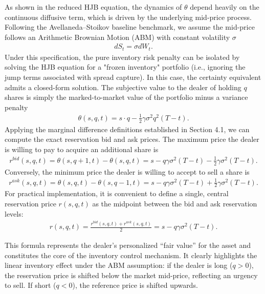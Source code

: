 \documentclass[a4paper,10pt,titlepage,oneside,openany]{book}
\theoremstyle{plain}\newtheorem{theorem}{Theorem}[chapter]
\theoremstyle{definition}\newtheorem{definition}{Definition}[chapter]
\theoremstyle{remark}\newtheorem{remark}{Remark}[chapter]
\begin{document}
As shown in the reduced HJB equation, the dynamics of $\theta$ depend heavily on the continuous diffusive term, which is driven by the underlying mid-price process. Following the Avellaneda--Stoikov baseline benchmark, we assume the mid-price follows an Arithmetic Brownian Motion (ABM) with constant volatility $\sigma$
\begin{align*}
    dS_t = \sigma dW_t.
\end{align*}
Under this specification, the pure inventory risk penalty can be isolated by solving the HJB equation for a "frozen inventory" portfolio (i.e., ignoring the jump terms associated with spread capture). In this case, the certainty equivalent admits a closed-form solution. The subjective value to the dealer of holding $q$ shares is simply the marked-to-market value of the portfolio minus a variance penalty
\begin{align*}
    \theta(s,q,t) = s \cdot q - \frac{1}{2}\gamma\sigma^2 q^2 (T-t).
\end{align*}
Applying the marginal difference definitions established in Section 4.1, we can compute the exact reservation bid and ask prices. The maximum price the dealer is willing to pay to acquire an additional share is
\begin{align*}
    r^{bid}(s,q,t) = \theta(s,q+1,t) - \theta(s,q,t) = s - q\gamma\sigma^2(T-t) - \frac{1}{2}\gamma\sigma^2(T-t).
\end{align*}
Conversely, the minimum price the dealer is willing to accept to sell a share is
\begin{align*}
    r^{ask}(s,q,t) = \theta(s,q,t) - \theta(s,q-1,t) = s - q\gamma\sigma^2(T-t) + \frac{1}{2}\gamma\sigma^2(T-t).
\end{align*}
For practical implementation, it is convenient to define a single, central reservation price $r(s,q,t)$ as the midpoint between the bid and ask reservation levels:
\begin{align*}
    r(s,q,t) = \frac{r^{bid}(s,q,t) + r^{ask}(s,q,t)}{2} = s - q\gamma\sigma^2(T-t).
\end{align*}

This formula represents the dealer's personalized ``fair value'' for the asset and constitutes the core of the inventory control mechanism. It clearly highlights the linear inventory effect under the ABM assumption: if the dealer is long ($q > 0$), the reservation price is shifted below the market mid-price, reflecting an urgency to sell. If short ($q < 0$), the reference price is shifted upwards. 
\end{document}
